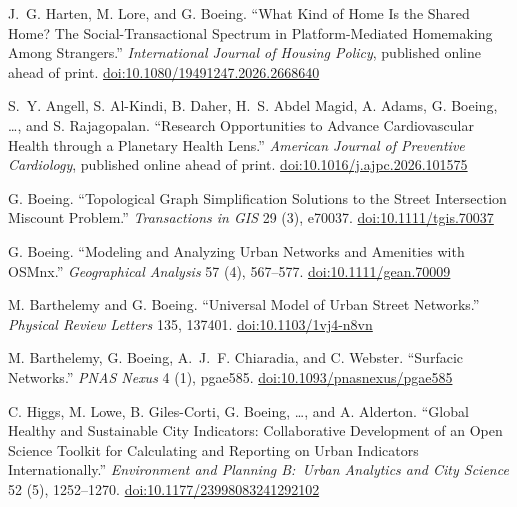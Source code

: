 \documentclass[11pt,a4paper]{report} %
\begin{document}
\begin{tablist}
\item[\the\year] \tab{}J.~G. Harten, M. Lore, and G. Boeing. \enquote{What Kind of Home Is the Shared Home? The Social-Transactional Spectrum in Platform-Mediated Homemaking Among Strangers.} \textit{International Journal of Housing Policy}, published online ahead of print. \href{https://doi.org/10.1080/19491247.2026.2668640}{doi:10.1080/19491247.2026.2668640}

\item[\the\year] \tab{}S.~Y. Angell, S. Al-Kindi, B. Daher, H.~S. Abdel Magid, A. Adams, G. Boeing, \ldots, and S. Rajagopalan. \enquote{Research Opportunities to Advance Cardiovascular Health through a Planetary Health Lens.} \textit{American Journal of Preventive Cardiology}, published online ahead of print. \href{https://doi.org/10.1016/j.ajpc.2026.101575}{doi:10.1016/j.ajpc.2026.101575}

\item[2025] \tab{}G. Boeing. \enquote{Topological Graph Simplification Solutions to the Street Intersection Miscount Problem.} \textit{Transactions in GIS} 29 (3), e70037. \href{https://doi.org/10.1111/tgis.70037}{doi:10.1111/tgis.70037}

\item[2025] \tab{}G. Boeing. \enquote{Modeling and Analyzing Urban Networks and Amenities with OSMnx.} \textit{Geographical Analysis} 57 (4), 567--577. \href{https://doi.org/10.1111/gean.70009}{doi:10.1111/gean.70009}

\item[2025] \tab{}M. Barthelemy and G. Boeing. \enquote{Universal Model of Urban Street Networks.} \textit{Physical Review Letters} 135, 137401. \href{https://doi.org/10.1103/1vj4-n8vn}{doi:10.1103/1vj4-n8vn}

\item[2025] \tab{}M. Barthelemy, G. Boeing, A.~J.~F. Chiaradia, and C. Webster. \enquote{Surfacic Networks.} \textit{PNAS Nexus} 4 (1), pgae585. \href{https://doi.org/10.1093/pnasnexus/pgae585}{doi:10.1093/pnasnexus/pgae585}

\item[2025] \tab{}C. Higgs, M. Lowe, B. Giles-Corti, G. Boeing, \ldots, and A. Alderton. \enquote{Global Healthy and Sustainable City Indicators: Collaborative Development of an Open Science Toolkit for Calculating and Reporting on Urban Indicators Internationally.} \textit{Environment and Planning B:\ Urban Analytics and City Science} 52 (5), 1252--1270. \href{https://doi.org/10.1177/23998083241292102}{doi:10.1177/23998083241292102}


\end{tablist}
\end{document}
